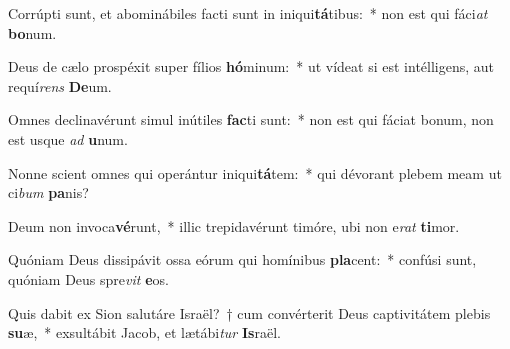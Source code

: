 \item Corrúpti sunt, et abominábiles facti sunt in iniqui\textbf{tá}tibus:~* non est qui fáci\textit{at} \textbf{bo}num.
\item Deus de cælo prospéxit super fílios \textbf{hó}minum:~* ut vídeat si est intélligens, aut requí\textit{rens} \textbf{De}um.
\item Omnes declinavérunt simul inútiles \textbf{fac}ti sunt:~* non est qui fáciat bonum, non est usque \textit{ad} \textbf{u}num.
\item Nonne scient omnes qui operántur iniqui\textbf{tá}tem:~* qui dévorant plebem meam ut ci\textit{bum} \textbf{pa}nis?
\item Deum non invoca\textbf{vé}runt,~* illic trepidavérunt timóre, ubi non e\textit{rat} \textbf{ti}mor.
\item Quóniam Deus dissipávit ossa eórum qui homínibus \textbf{pla}cent:~* confúsi sunt, quóniam Deus spre\textit{vit} \textbf{e}os.
\item Quis dabit ex Sion salutáre Israël?~† cum convérterit Deus captivitátem plebis \textbf{su}æ,~* exsultábit Jacob, et lætábi\textit{tur} \textbf{Is}raël.
